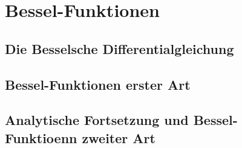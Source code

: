 %
%
%
\section{Bessel-Funktionen
\label{buch:differntialgleichungen:section:bessel}}

\subsection{Die Besselsche Differentialgleichung}

\subsection{Bessel-Funktionen erster Art}

\subsection{Analytische Fortsetzung und Bessel-Funktioenn zweiter Art}
